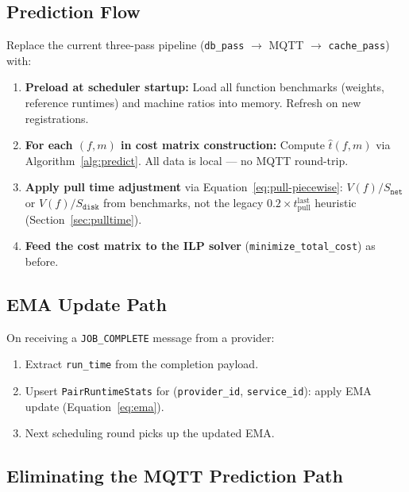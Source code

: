 \documentclass[11pt, a4paper]{article}
\begin{document}
\subsection{Prediction Flow}

Replace the current three-pass pipeline
(\texttt{db\_pass} $\to$ MQTT $\to$ \texttt{cache\_pass}) with:

\begin{enumerate}
    \item \textbf{Preload at scheduler startup:} Load all function
          benchmarks (weights, reference runtimes) and machine ratios
          into memory. Refresh on new registrations.

    \item \textbf{For each $(f, m)$ in cost matrix construction:}
          Compute $\hat{t}(f, m)$ via Algorithm~\ref{alg:predict}.
          All data is local --- no MQTT round-trip.

    \item \textbf{Apply pull time adjustment} via
          Equation~\ref{eq:pull-piecewise}:
          $V(f)/S_{\texttt{net}}$ or $V(f)/S_{\texttt{disk}}$
          from benchmarks, not the legacy
          $0.2 \times t_{\mathrm{pull}}^{\mathrm{last}}$ heuristic
          (Section~\ref{sec:pulltime}).

    \item \textbf{Feed the cost matrix to the ILP solver}
          (\texttt{minimize\_total\_cost}) as before.
\end{enumerate}

\subsection{EMA Update Path}

On receiving a \texttt{JOB\_COMPLETE} message from a provider:

\begin{enumerate}
    \item Extract \texttt{run\_time} from the completion payload.
    \item Upsert \texttt{PairRuntimeStats} for
          (\texttt{provider\_id}, \texttt{service\_id}):
          apply EMA update (Equation~\ref{eq:ema}).
    \item Next scheduling round picks up the updated EMA.
\end{enumerate}

\subsection{Eliminating the MQTT Prediction Path}
\end{document}
